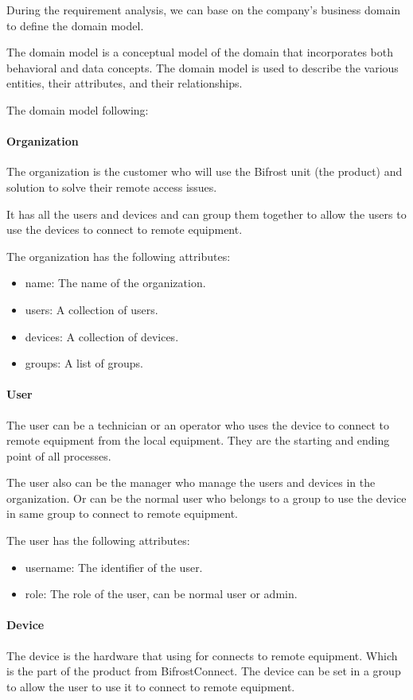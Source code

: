 During the requirement analysis, we can base on the company's business domain 
to define the domain model.

The domain model is a conceptual model of the domain that incorporates both
behavioral and data concepts.
The domain model is used to describe the various entities, their attributes,
and their relationships.

The domain model following:

\paragraph{Organization}
The organization is the customer who will use the Bifrost unit (the product) and solution
to solve their remote access issues.

It has all the users and devices and can group them together to allow the users to
use the devices to connect to remote equipment.

The organization has the following attributes:
\begin{itemize}
    \item name: The name of the organization.
    \item users: A collection of users.
    \item devices: A collection of devices.
    \item groups: A list of groups.
\end{itemize}

\paragraph{User}
The user can be a technician or an operator who uses the device to connect to remote equipment
from the local equipment. They are the starting and ending point of all processes. 

The user also can be the manager who manage the users and devices in the organization.
Or can be the normal user who belongs to a group to use the device in same group to 
connect to remote equipment.

The user has the following attributes:
\begin{itemize}
    \item username: The identifier of the user.
    \item role: The role of the user, can be normal user or admin.
\end{itemize}

\paragraph{Device}
The device is the hardware that using for connects to remote equipment.
Which is the part of the product from BifrostConnect. The device can be set in
a group to allow the user to use it to connect to remote equipment.

